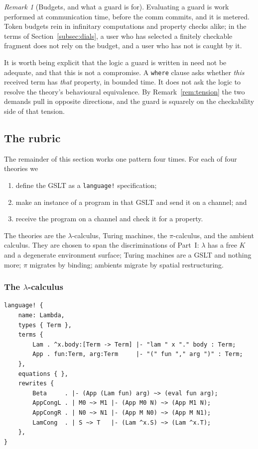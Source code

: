 \documentclass[11pt]{article}
\theoremstyle{definition}
\theoremstyle{plain}
\theoremstyle{remark}
\newtheorem{remark}[definition]{Remark}
\begin{document}
\begin{remark}[Budgets, and what a guard is for]
Evaluating a guard is work performed at communication time, before the comm commits, and
it is metered. Token budgets rein in infinitary computations and property checks alike;
in the terms of Section~\ref{subsec:dials}, a user who has selected a finitely checkable
fragment does not rely on the budget, and a user who has not is caught by it.

It is worth being explicit that the logic a guard is written in need not be adequate, and
that this is not a compromise. A \texttt{where} clause asks whether \emph{this} received
term has \emph{that} property, in bounded time. It does not ask the logic to resolve the
theory's behavioural equivalence. By Remark~\ref{rem:tension} the two demands pull in
opposite directions, and the guard is squarely on the checkability side of that tension.
\end{remark}

\subsection{The rubric}

The remainder of this section works one pattern four times. For each of four theories we

\begin{enumerate}[label=(\arabic*),leftmargin=2.5em]
  \item define the GSLT as a \texttt{language!} specification;
  \item make an instance of a program in that GSLT and send it on a channel; and
  \item receive the program on a channel and check it for a property.
\end{enumerate}

The theories are the $\lambda$-calculus, Turing machines, the $\pi$-calculus, and the
ambient calculus. They are chosen to span the discriminations of Part~I: $\lambda$ has a
free $K$ and a degenerate environment surface; Turing machines are a GSLT and nothing more;
$\pi$ migrates by binding; ambients migrate by spatial restructuring.

\subsubsection{The \texorpdfstring{$\lambda$}{lambda}-calculus}

\begin{lstlisting}
language! {
    name: Lambda,
    types { Term },
    terms {
        Lam . ^x.body:[Term -> Term] |- "lam " x "." body : Term;
        App . fun:Term, arg:Term     |- "(" fun "," arg ")" : Term;
    },
    equations { },
    rewrites {
        Beta     . |- (App (Lam fun) arg) ~> (eval fun arg);
        AppCongL . | M0 ~> M1 |- (App M0 N) ~> (App M1 N);
        AppCongR . | N0 ~> N1 |- (App M N0) ~> (App M N1);
        LamCong  . | S ~> T   |- (Lam ^x.S) ~> (Lam ^x.T);
    },
}
\end{lstlisting}
\end{document}
